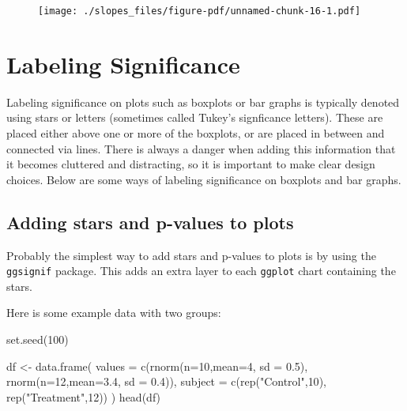 \documentclass[
  letterpaper,
  DIV=11,
  numbers=noendperiod]{scrreprt}
\newenvironment{Shaded}{\begin{snugshade}}{\end{snugshade}}
\newcommand{\AttributeTok}[1]{\textcolor[rgb]{0.40,0.45,0.13}{#1}}
\newcommand{\DecValTok}[1]{\textcolor[rgb]{0.68,0.00,0.00}{#1}}
\newcommand{\FloatTok}[1]{\textcolor[rgb]{0.68,0.00,0.00}{#1}}
\newcommand{\FunctionTok}[1]{\textcolor[rgb]{0.28,0.35,0.67}{#1}}
\newcommand{\NormalTok}[1]{\textcolor[rgb]{0.00,0.23,0.31}{#1}}
\newcommand{\OtherTok}[1]{\textcolor[rgb]{0.00,0.23,0.31}{#1}}
\newcommand{\StringTok}[1]{\textcolor[rgb]{0.13,0.47,0.30}{#1}}
\begin{document}
\begin{figure}[H]

{\centering \texttt{[image: ./slopes\_files/figure-pdf/unnamed-chunk-16-1.pdf]}

}

\end{figure}


\hypertarget{labeling-significance}{%
\chapter{Labeling Significance}\label{labeling-significance}}

Labeling significance on plots such as boxplots or bar graphs is
typically denoted using stars or letters (sometimes called Tukey's
signficance letters). These are placed either above one or more of the
boxplots, or are placed in between and connected via lines. There is
always a danger when adding this information that it becomes cluttered
and distracting, so it is important to make clear design choices. Below
are some ways of labeling significance on boxplots and bar graphs.

\hypertarget{adding-stars-and-p-values-to-plots}{%
\section{Adding stars and p-values to
plots}\label{adding-stars-and-p-values-to-plots}}

Probably the simplest way to add stars and p-values to plots is by using
the \texttt{ggsignif} package. This adds an extra layer to each
\texttt{ggplot} chart containing the stars.

Here is some example data with two groups:

\begin{Shaded}
\begin{Highlighting}[]
\FunctionTok{set.seed}\NormalTok{(}\DecValTok{100}\NormalTok{)}

\NormalTok{df }\OtherTok{\textless{}{-}} \FunctionTok{data.frame}\NormalTok{(}
  \AttributeTok{values =} \FunctionTok{c}\NormalTok{(}\FunctionTok{rnorm}\NormalTok{(}\AttributeTok{n=}\DecValTok{10}\NormalTok{,}\AttributeTok{mean=}\DecValTok{4}\NormalTok{, }\AttributeTok{sd =} \FloatTok{0.5}\NormalTok{), }
             \FunctionTok{rnorm}\NormalTok{(}\AttributeTok{n=}\DecValTok{12}\NormalTok{,}\AttributeTok{mean=}\FloatTok{3.4}\NormalTok{, }\AttributeTok{sd =} \FloatTok{0.4}\NormalTok{)),}
  \AttributeTok{subject =} \FunctionTok{c}\NormalTok{(}\FunctionTok{rep}\NormalTok{(}\StringTok{"Control"}\NormalTok{,}\DecValTok{10}\NormalTok{), }\FunctionTok{rep}\NormalTok{(}\StringTok{"Treatment"}\NormalTok{,}\DecValTok{12}\NormalTok{))}
\NormalTok{)}
\FunctionTok{head}\NormalTok{(df)}
\end{Highlighting}
\end{Shaded}
\end{document}
